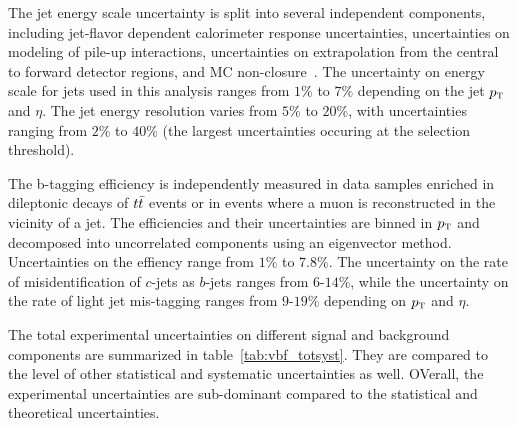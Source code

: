 The jet energy scale uncertainty is split into several independent components, including jet-flavor dependent calorimeter response uncertainties, uncertainties on modeling of pile-up interactions, uncertainties on extrapolation from the central to forward detector regions, and MC non-closure~\cite{atlas_jets}. The uncertainty on energy scale for jets used in this analysis ranges from $1\%$ to $7\%$ depending on the jet $p_{\textrm{\footnotesize\sc t}}$ and $\eta$. The jet energy resolution varies from $5\%$ to $20\%$, with uncertainties ranging from $2\%$ to $40\%$ (the largest uncertainties occuring at the selection threshold).

The b-tagging efficiency is independently measured in data samples enriched in dileptonic decays of $t\bar{t}$ events or in events where a muon is reconstructed in the vicinity of a jet\cite{btag-calib,btag-muons}. The efficiencies and their uncertainties are binned in $p_{\textrm{\footnotesize\sc t}}$ and decomposed into uncorrelated components using an eigenvector method\cite{ATLAS-CONF-2014-004}. Uncertainties on the effiency range from $1\%$ to $7.8\%$. The uncertainty on the rate of misidentification of $c$-jets as $b$-jets ranges from $6$-$14$\%, while the uncertainty on the rate of light jet mis-tagging ranges from $9$-$19\%$ depending on $p_{\textrm{\footnotesize\sc t}}$ and $\eta$.

The total experimental uncertainties on different signal and background components are summarized in table~\ref{tab:vbf_totsyst}. They are compared to the level of other statistical and systematic uncertainties as well. OVerall, the experimental uncertainties are sub-dominant compared to the statistical and theoretical uncertainties.

